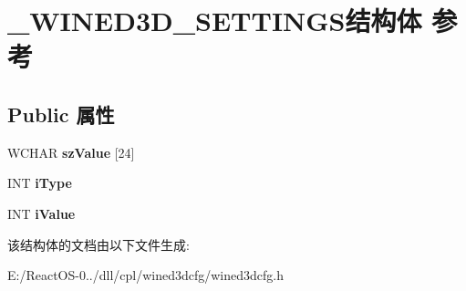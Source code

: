 \hypertarget{struct___w_i_n_e_d3_d___s_e_t_t_i_n_g_s}{}\section{\+\_\+\+W\+I\+N\+E\+D3\+D\+\_\+\+S\+E\+T\+T\+I\+N\+G\+S结构体 参考}
\label{struct___w_i_n_e_d3_d___s_e_t_t_i_n_g_s}
\subsection*{Public 属性}
\begin{DoxyCompactItemize}
\item 
\mbox{\label{struct___w_i_n_e_d3_d___s_e_t_t_i_n_g_s_a33182c6b4887241ec915f99073fed816}} 
W\+C\+H\+AR {\bfseries sz\+Value} \mbox{[}24\mbox{]}
\item 
\mbox{\label{struct___w_i_n_e_d3_d___s_e_t_t_i_n_g_s_ad1f81f183b1de57b1d657d8e62e24ffb}} 
I\+NT {\bfseries i\+Type}
\item 
\mbox{\label{struct___w_i_n_e_d3_d___s_e_t_t_i_n_g_s_abade642d19b22dbb8d7d143870bc4759}} 
I\+NT {\bfseries i\+Value}
\end{DoxyCompactItemize}


该结构体的文档由以下文件生成\+:\begin{DoxyCompactItemize}
\item 
E\+:/\+React\+O\+S-\/0../dll/cpl/wined3dcfg/wined3dcfg.\+h\end{DoxyCompactItemize}
